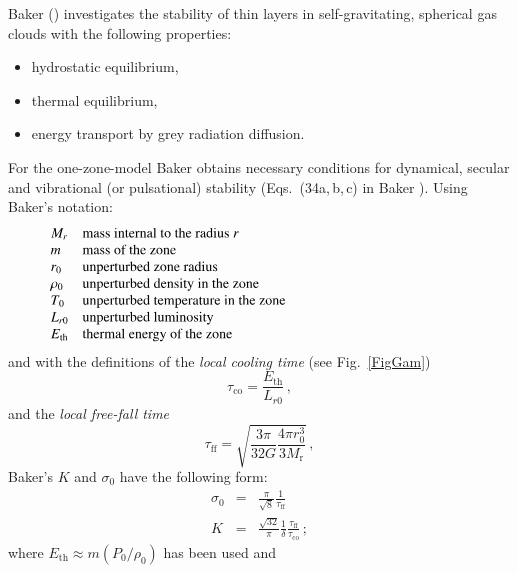 \documentclass{aa}
\begin{document}
   Baker (\cite{baker}) investigates the stability of thin layers in
   self-gravitating,
   spherical gas clouds with the following properties:
   \begin{itemize}
      \item hydrostatic equilibrium,
      \item thermal equilibrium,
      \item energy transport by grey radiation diffusion.
   \end{itemize}
   For the one-zone-model Baker obtains necessary conditions
   for dynamical, secular and vibrational (or pulsational)
   stability (Eqs.\ (34a,\,b,\,c) in Baker \cite{baker}). Using Baker's
   notation:
   \[
      \begin{array}{lp{0.8\linewidth}}
         M_{r}  & mass internal to the radius $r$     \\
         m               & mass of the zone                    \\
         r_0             & unperturbed zone radius             \\
         \rho_0          & unperturbed density in the zone     \\
         T_0             & unperturbed temperature in the zone \\
         L_{r0}          & unperturbed luminosity              \\
         E_{\mathrm{th}} & thermal energy of the zone
      \end{array}
   \]
\noindent
   and with the definitions of the \emph{local cooling time\/}
   (see Fig.~\ref{FigGam})
   \begin{equation}
      \tau_{\mathrm{co}} = \frac{E_{\mathrm{th}}}{L_{r0}} \,,
   \end{equation}
   and the \emph{local free-fall time}
   \begin{equation}
      \tau_{\mathrm{ff}} =
         \sqrt{ \frac{3 \pi}{32 G} \frac{4\pi r_0^3}{3 M_{\mathrm{r}}}
}\,,
   \end{equation}
   Baker's $K$ and $\sigma_0$ have the following form:
   \begin{eqnarray}
      \sigma_0 & = & \frac{\pi}{\sqrt{8}}
                     \frac{1}{ \tau_{\mathrm{ff}}} \\
      K        & = & \frac{\sqrt{32}}{\pi} \frac{1}{\delta}
                        \frac{ \tau_{\mathrm{ff}} }
                             { \tau_{\mathrm{co}} }\,;
   \end{eqnarray}
   where $ E_{\mathrm{th}} \approx m (P_0/{\rho_0})$ has been used and
\end{document}
